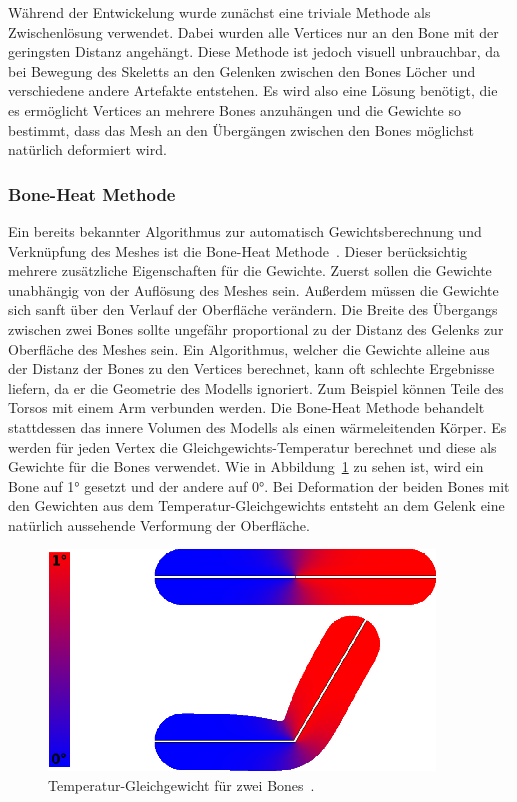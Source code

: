 Während der Entwickelung wurde zunächst eine triviale Methode als Zwischenlösung verwendet. Dabei wurden alle Vertices nur an den Bone mit der geringsten Distanz angehängt. Diese Methode ist jedoch visuell unbrauchbar, da bei Bewegung des Skeletts an den Gelenken zwischen den Bones Löcher und verschiedene andere Artefakte entstehen. Es wird also eine Lösung benötigt, die es ermöglicht Vertices an mehrere Bones anzuhängen und die Gewichte so bestimmt, dass das Mesh an den Übergängen zwischen den Bones möglichst natürlich deformiert wird.

\subsubsection{Bone-Heat Methode}
Ein bereits bekannter Algorithmus zur automatisch Gewichtsberechnung und Verknüpfung des Meshes ist die Bone-Heat Methode~\cite{bone_heat_paper}. Dieser berücksichtig mehrere zusätzliche Eigenschaften für die Gewichte. Zuerst sollen die Gewichte unabhängig von der Auflösung des Meshes sein. Außerdem müssen die Gewichte sich sanft über den Verlauf der Oberfläche verändern. Die Breite des Übergangs zwischen zwei Bones sollte ungefähr proportional zu der Distanz des Gelenks zur Oberfläche des Meshes sein.
Ein Algorithmus, welcher die Gewichte alleine aus der Distanz der Bones zu den Vertices berechnet, kann oft schlechte Ergebnisse liefern, da er die Geometrie des Modells ignoriert. Zum Beispiel können Teile des Torsos mit einem Arm verbunden werden. Die Bone-Heat Methode behandelt stattdessen das innere Volumen des Modells als einen wärmeleitenden Körper. Es werden für jeden Vertex die Gleichgewichts-Temperatur berechnet und diese als Gewichte für die Bones verwendet. Wie in Abbildung~\ref{fig:bone_heat_equilibrium} zu sehen ist, wird ein Bone auf 1° gesetzt und der andere auf 0°. Bei Deformation der beiden Bones mit den Gewichten aus dem Temperatur-Gleichgewichts entsteht an dem Gelenk eine natürlich aussehende Verformung der Oberfläche.

\begin{figure}[h!]
	\centering
	\includegraphics[width=0.7\linewidth]{resources/img/bone_heat_equilibrium.png}
	\caption{Temperatur-Gleichgewicht für zwei Bones~\cite{bone_heat_paper}.}
	\label{fig:bone_heat_equilibrium}
\end{figure}

